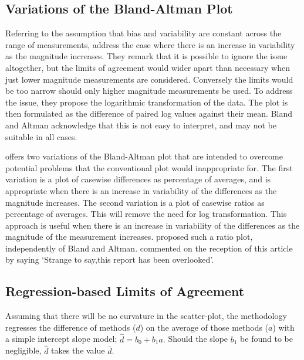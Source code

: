 \documentclass[12pt, a4paper]{report}
\begin{document}
	
	
	
	\subsection{Variations of the Bland-Altman Plot} Referring to the
	assumption that bias and variability are constant across the range
	of measurements, \citet{BA99} address the case where there is an
	increase in variability as the magnitude increases. They remark
	that it is possible to ignore the issue altogether, but the limits
	of agreement would wider apart than necessary when just lower
	magnitude measurements are considered. Conversely the limits would
	be too narrow should only higher magnitude measurements be used.
	To address the issue, they propose the logarithmic transformation
	of the data. The plot is then formulated as the difference of
	paired log values against their mean. Bland and Altman acknowledge
	that this is not easy to interpret, and may not be suitable in
	all cases.
	
	\citet{BA99} offers two variations of the Bland-Altman plot that
	are intended to overcome potential problems that the conventional
	plot would inappropriate for. The first variation is a plot of
	casewise differences as percentage of averages, and is appropriate
	when there is an increase in variability of the differences as the
	magnitude increases. The second variation is a plot of casewise
	ratios as percentage of averages. This will remove the need for
	log transformation. This approach is useful when there is an
	increase in variability of the differences as the magnitude of the
	measurement increases. \citet{Eksborg} proposed such a ratio plot,
	independently of Bland and Altman. \citet{Dewitte} commented on
	the reception of this article by saying `Strange to say,this
	report has been overlooked'.
	
	
	
	
	

	\subsection{Regression-based Limits of Agreement} Assuming that
	there will be no curvature in the scatter-plot, the methodology
	regresses the difference of methods ($d$) on the average of those
	methods ($a$) with a simple intercept slope model; $\hat{d} =
	b_{0}+ b_{1}a.$ Should the slope $b_{1}$ be found to be
	negligible, $\hat{d}$ takes the value $\bar{d}$.
	
\end{document}
